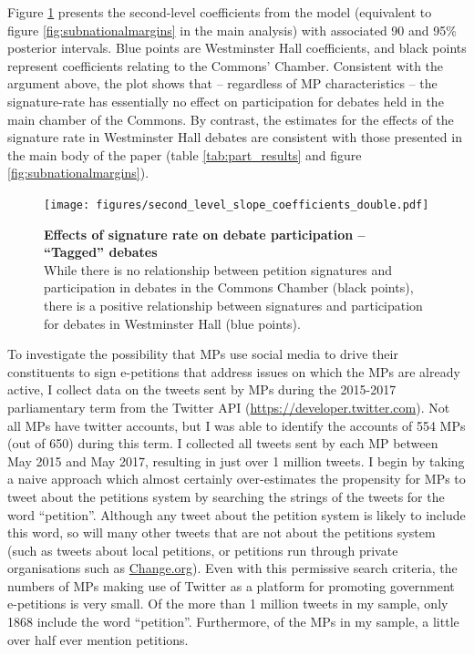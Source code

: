 \documentclass[12pt]{article}
\makeatletter
\renewcommand{\section}{\@startsection{section}{1}{0mm}{-\baselineskip}{0.20\baselineskip}{\centering\normalfont\normalsize\scshape}}
\makeatother
\begin{document}
Figure \ref{fig:second_level_double} presents the second-level coefficients from the model (equivalent to figure \ref{fig:subnationalmargins} in the main analysis) with associated 90 and 95\% posterior intervals. Blue points are Westminster Hall coefficients, and black points represent coefficients relating to the Commons' Chamber. Consistent with the argument above, the plot shows that -- regardless of MP characteristics -- the signature-rate has essentially no effect on participation for debates held in the main chamber of the Commons. By contrast, the estimates for the effects of the signature rate in Westminster Hall debates are consistent with those presented in the main body of the paper (table \ref{tab:part_results} and figure \ref{fig:subnationalmargins}).

\begin{figure}[t]
\centering

\texttt{[image: figures/second\_level\_slope\_coefficients\_double.pdf]}

\caption{\label{fig:second_level_double} \textbf{Effects of signature rate on debate participation -- ``Tagged'' debates}\\
While there is no relationship between petition signatures and participation in debates in the Commons Chamber (black points), there is a positive relationship between signatures and participation for debates in Westminster Hall (blue points).}

\end{figure}

\clearpage

\section{MP promotion of e-petitions via Twitter}\label{app:twitter}

To investigate the possibility that MPs use social media to drive their constituents to sign e-petitions that address issues on which the MPs are already active, I collect data on the tweets sent by MPs during the 2015-2017 parliamentary term from the Twitter API (\url{https://developer.twitter.com}). Not all MPs have twitter accounts, but I was able to identify the accounts of 554 MPs (out of 650) during this term. I collected all tweets sent by each MP between May 2015 and May 2017, resulting in just over 1 million tweets. I begin by taking a naive approach which almost certainly over-estimates the propensity for MPs to tweet about the petitions system by searching the strings of the tweets for the word ``petition''. Although any tweet about the petition system is likely to include this word, so will many other tweets that are not about the petitions system (such as tweets about local petitions, or petitions run through private organisations such as \href{http://www.change.org}{Change.org}). Even with this permissive search criteria, the numbers of MPs making use of Twitter as a platform for promoting government e-petitions is very small. Of the more than 1 million tweets in my sample, only 1868 include the word ``petition''. Furthermore, of the MPs in my sample, a little over half ever mention petitions.
\end{document}
